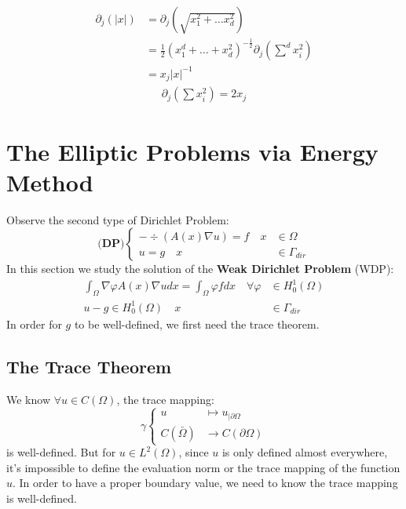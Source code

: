 \begin{align*}
	\partial_j(|x|) &= \partial_j (\sqrt{x_1^2 + \dots x_d^2})\\
	&=\frac{1}{2} (x_1^d + \dots + x_d^2)^{-\frac{1}{2}} \partial_j (\sum^d x_i^2)\\
	&= x_j |x|^{-1}
\end{align*}
\begin{align*}
	\partial_j(\sum x_i^2) = 2x_j
\end{align*}












\newpage
\section{The Elliptic Problems via Energy Method}
Observe the second type of Dirichlet Problem:
\begin{equation}\label{PE:DP(2)}
\textbf{(DP)} \left\{
\begin{aligned}
	-\div(A(x) \nabla u) = f \quad x &\in \Omega\\
	u = g \quad x &\in \Gamma_{dir}
\end{aligned}
\right.	
\end{equation}
In this section we study the solution of the \textbf{Weak Dirichlet Problem} (WDP):
\begin{equation}
\begin{aligned}
	\int_\Omega \nabla \varphi A(x) \nabla u dx = \int_\Omega \varphi f dx
	\quad \forall \varphi &\in H^1_0(\Omega)\\
	 u - g \in H^1_0(\Omega) \quad x &\in \Gamma_{dir}
\end{aligned}	
\end{equation}
In order for $g$ to be well-defined, we first need the trace theorem. 


\subsection{The Trace Theorem}
We know $\forall u \in C(\Omega)$, the trace mapping:
\begin{equation*}
\gamma\left\{
\begin{aligned}
	u &\mapsto u_{|\partial \Omega}\\
	C(\bar{\Omega}) &\rightarrow C(\partial \Omega)
\end{aligned}
\right.	
\end{equation*}
is well-defined. But for $u \in L^2(\Omega)$, since $u$ is only defined almost everywhere, it's impossible to define the evaluation norm or the trace mapping of the function $u$. In order to have a proper boundary value, we need to know the trace mapping is well-defined.

